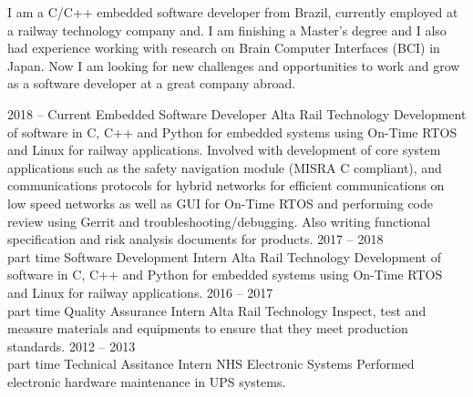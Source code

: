 \documentclass[9pt]{developercv} %
\begin{document}

\begin{minipage}[t]{0.4\textwidth} %
	\vspace{-\baselineskip} %
	I am a C/C++ embedded software developer from Brazil, currently employed at a railway
	technology company and. I am finishing a Master's degree and I also had experience working
	with research on Brain Computer Interfaces (BCI) in Japan. Now I am looking for new challenges 
	and opportunities to work and grow as a software developer at a great company abroad.
\end{minipage}
\hfill %
\begin{minipage}[t]{0.5\textwidth} %
	\vspace{-\baselineskip} %
	\begin{barchart}{5.5}
	\end{barchart}
\end{minipage}

\begin{center}
\end{center}



\begin{entrylist}
	\entry
		{2018 -- Current}
		{Embedded Software Developer}
		{Alta Rail Technology}
		{Development of software in C, C++ and Python for embedded systems using On-Time RTOS and
		Linux for railway applications. Involved with development of core system applications such
		as the safety navigation module (MISRA C compliant), and communications protocols for hybrid
		networks for efficient communications on low speed networks as well as GUI for On-Time RTOS
		and performing code review using Gerrit and troubleshooting/debugging. Also writing functional
		specification and risk analysis documents for products.}
	\entry
		{2017 -- 2018\\\footnotesize{part time}}
		{Software Development Intern}
		{Alta Rail Technology}
		{Development of software in C, C++ and Python for embedded systems using On-Time RTOS and 
		Linux for railway applications.}
	\entry
		{2016 -- 2017\\\footnotesize{part time}}
		{Quality Assurance Intern}
		{Alta Rail Technology}
		{Inspect, test and measure materials and equipments to ensure that they meet production standards.}
	\entry
		{2012 -- 2013\\\footnotesize{part time}}
		{Technical Assitance Intern}
		{NHS Electronic Systems}
		{Performed electronic hardware maintenance in UPS systems.}
\end{entrylist}
\end{document}
